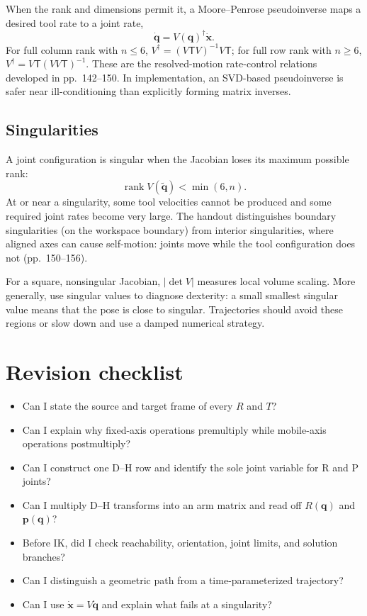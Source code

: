 \documentclass[11pt,a4paper]{article}
\newcommand{\trans}{\mathsf{T}}
\begin{document}
When the rank and dimensions permit it, a Moore--Penrose pseudoinverse maps a desired tool rate to a joint rate,
\[
  \dot{\mathbf q}=V(\mathbf q)^\dagger\dot{\mathbf x}.
\]
For full column rank with $n\leq6$, $V^\dagger=(V\trans V)^{-1}V\trans$; for full row rank with $n\geq6$, $V^\dagger=V\trans(VV\trans)^{-1}$. These are the resolved-motion rate-control relations developed in pp.~142--150. In implementation, an SVD-based pseudoinverse is safer near ill-conditioning than explicitly forming matrix inverses.

\subsection{Singularities}

A joint configuration is singular when the Jacobian loses its maximum possible rank:
\[
  \operatorname{rank}V(\widetilde{\mathbf q})<\min(6,n).
\]
At or near a singularity, some tool velocities cannot be produced and some required joint rates become very large. The handout distinguishes boundary singularities (on the workspace boundary) from interior singularities, where aligned axes can cause self-motion: joints move while the tool configuration does not (pp.~150--156).

For a square, nonsingular Jacobian, $|\det V|$ measures local volume scaling. More generally, use singular values to diagnose dexterity: a small smallest singular value means that the pose is close to singular. Trajectories should avoid these regions or slow down and use a damped numerical strategy.

\section{Revision checklist}

\begin{itemize}
  \item Can I state the source and target frame of every $R$ and $T$?
  \item Can I explain why fixed-axis operations premultiply while mobile-axis operations postmultiply?
  \item Can I construct one D--H row and identify the sole joint variable for R and P joints?
  \item Can I multiply D--H transforms into an arm matrix and read off $R(\mathbf q)$ and $\mathbf p(\mathbf q)$?
  \item Before IK, did I check reachability, orientation, joint limits, and solution branches?
  \item Can I distinguish a geometric path from a time-parameterized trajectory?
  \item Can I use $\dot{\mathbf x}=V\dot{\mathbf q}$ and explain what fails at a singularity?
\end{itemize}
\end{document}

